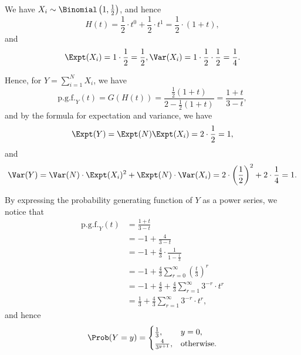 We have \(X_i \sim \Binomial\left(1, \frac{1}{2}\right)\), and hence
\[
    H(t) = \frac{1}{2} \cdot t^0 + \frac{1}{2} \cdot t^1 = \frac{1}{2} \cdot (1 + t),
\]
and
\[
    \Expt(X_i) = 1 \cdot \frac{1}{2} = \frac{1}{2}, \Var(X_i) = 1 \cdot \frac{1}{2} \cdot \frac{1}{2} = \frac{1}{4}.
\]

Hence, for \(Y = \sum_{i = 1}^{N} X_i\), we have
\[
    \text{p.g.f.}_{Y}(t) = G(H(t)) = \frac{\frac{1}{2} (1 + t)}{2 - \frac{1}{2} (1 + t)} = \frac{1 + t}{3 - t},
\]
and by the formula for expectation and variance, we have
\[
    \Expt(Y) = \Expt(N) \Expt(X_i) = 2 \cdot \frac{1}{2} = 1,
\]
and
\[
    \Var(Y) = \Var(N) \cdot \Expt(X_i)^2 + \Expt(N) \cdot \Var(X_i) = 2 \cdot \left(\frac{1}{2}\right)^2 + 2 \cdot \frac{1}{4} = 1.
\]

By expressing the probability generating function of \(Y\) as a power series, we notice that
\begin{align*}
    \text{p.g.f.}_{Y}(t) & = \frac{1 + t}{3 - t}                                                   \\
                         & = -1 + \frac{4}{3 - t}                                                  \\
                         & = -1 + \frac{4}{3} \cdot \frac{1}{1 - \frac{t}{3}}                      \\
                         & = -1 + \frac{4}{3} \sum_{r = 0}^{\infty} \left(\frac{t}{3}\right)^r     \\
                         & = -1 + \frac{4}{3} + \frac{4}{3} \sum_{r = 1}^{\infty} 3^{-r} \cdot t^r \\
                         & = \frac{1}{3} + \frac{4}{3} \sum_{r = 1}^{\infty} 3^{-r} \cdot t^r,
\end{align*}
and hence
\begin{align*}
    \Prob(Y = y) = \begin{cases}
                       \frac{1}{3},         & y = 0,            \\
                       \frac{4}{3^{y + 1}}, & \text{otherwise}.
                   \end{cases}
\end{align*}